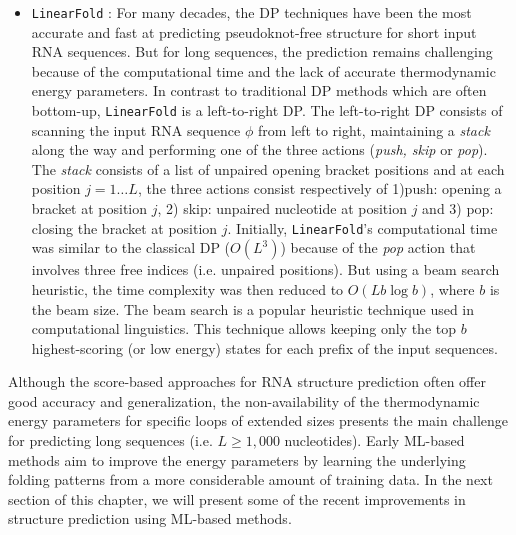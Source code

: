 \begin{itemize}
	\item \texttt{LinearFold} \cite{huang2019linearfold}: For many decades, the \ac{DP} techniques have been the most accurate and fast at predicting pseudoknot-free structure for short input \ac{RNA} sequences. But for long sequences, the prediction remains challenging because of the computational time and the lack of accurate thermodynamic energy parameters. In contrast to traditional \ac{DP} methods which are often bottom-up, \texttt{LinearFold} is a left-to-right \ac{DP}. The left-to-right \ac{DP} consists of scanning the input \ac{RNA} sequence $\phi$ from left to right,  maintaining a \textit{stack} along the way and performing one of the three actions (\textit{push, skip} or \textit{pop}). The \textit{stack} consists of a list of unpaired opening bracket positions and at each position $j = 1\dots L$, the three actions consist respectively of 1)push: opening a bracket at position $j$, 2) skip: unpaired nucleotide at position $j$ and 3) pop: closing the bracket at position $j$. Initially, \texttt{LinearFold}'s computational time was similar to the classical \ac{DP} ($O(L^3)$) because of the \textit{pop} action that involves three free indices (i.e. unpaired positions). But using a beam search heuristic, the time complexity was then reduced to $O(Lb\log  b)$, where $b$ is the beam size. The beam search is a popular heuristic technique used in computational linguistics. This technique allows keeping only the top $b$ highest-scoring (or low energy) states for each prefix of the input sequences.
\end{itemize}

Although the score-based approaches for \ac{RNA} structure prediction often offer good accuracy and generalization,  the non-availability of the thermodynamic energy parameters for specific loops of extended sizes presents the main challenge for predicting long sequences (i.e. $L \geq 1,000$ nucleotides).  Early \ac{ML}-based methods aim to improve the energy parameters by learning the underlying folding patterns from a more considerable amount of training data.  In the next section of this chapter, we will present some of the recent improvements in structure prediction using \ac{ML}-based methods.
